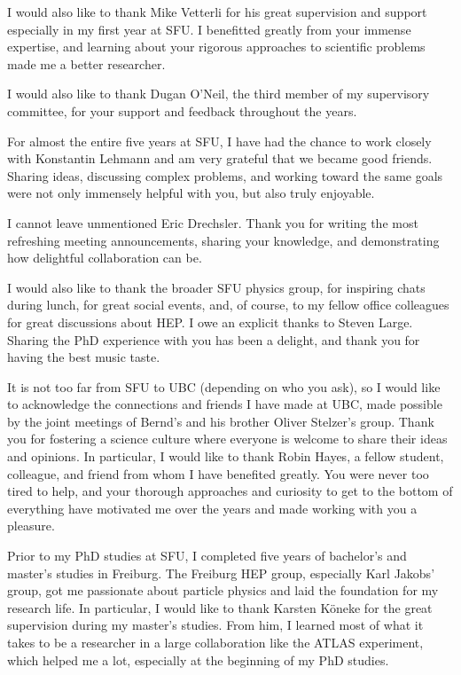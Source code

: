 I would also like to thank Mike Vetterli for his great supervision and support especially in my first year at SFU. 
I benefitted greatly from your immense expertise, and learning about your rigorous approaches to scientific problems made me a better researcher. 

I would also like to thank Dugan O'Neil, the third member of my supervisory committee, for your support and feedback throughout the years. 

For almost the entire five years at SFU, I have had the chance to work closely with Konstantin Lehmann and am very grateful that we became good friends. Sharing ideas, discussing complex problems, and working toward the same goals were not only immensely helpful with you, but also truly enjoyable. 

I cannot leave unmentioned Eric Drechsler. Thank you for writing the most refreshing meeting announcements, sharing your knowledge, and demonstrating how delightful collaboration can be.

I would also like to thank the broader SFU physics group, for inspiring chats during lunch, for great social events, and, of course, to my fellow office colleagues for great discussions about HEP.
I owe an explicit thanks to Steven Large. Sharing the PhD experience with you has been a delight, and thank you for having the best music taste. 

It is not too far from SFU to UBC (depending on who you ask), so I would like to acknowledge the connections and friends I have made at UBC, made possible by the joint meetings of Bernd's and his brother Oliver Stelzer's group. 
Thank you for fostering a science culture where everyone is welcome to share their ideas and opinions. 
In particular, I would like to thank Robin Hayes, a fellow student, colleague, and friend from whom I have benefited greatly. You were never too tired to help, and your thorough approaches and curiosity to get to the bottom of everything have motivated me over the years and made working with you a pleasure. 

Prior to my PhD studies at SFU, I completed five years of bachelor's and master's studies in Freiburg. 
The Freiburg HEP group, especially Karl Jakobs' group, got me passionate about particle physics and laid the foundation for my research life.
In particular, I would like to thank Karsten Köneke for the great supervision during my master's studies.
From him, I learned most of what it takes to be a researcher in a large collaboration like the ATLAS experiment, which helped me a lot, especially at the beginning of my PhD studies.

